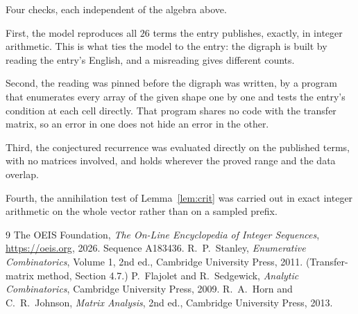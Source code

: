 \documentclass[11pt,a4paper]{article}
\theoremstyle{plain}
\theoremstyle{definition}
\begin{document}
Four checks, each independent of the algebra above.

First, the model reproduces all $26$ terms the entry publishes, exactly, in integer
arithmetic. This is what ties the model to the entry: the digraph is built by reading the
entry's English, and a misreading gives different counts.

Second, the reading was pinned before the digraph was written, by a program that enumerates
every array of the given shape one by one and tests the entry's condition at each cell
directly. That program shares no code with the transfer matrix, so an error in one does not
hide an error in the other.

Third, the conjectured recurrence was evaluated directly on the published terms, with no
matrices involved, and holds wherever the proved range and the data overlap.

Fourth, the annihilation test of Lemma~\ref{lem:crit} was carried out in exact integer
arithmetic on the whole vector rather than on a sampled prefix.

\begin{thebibliography}{9}
 The OEIS Foundation, \emph{The On-Line Encyclopedia of Integer
Sequences}, \url{https://oeis.org}, 2026. Sequence A183436.
 R.~P.~Stanley, \emph{Enumerative Combinatorics}, Volume 1, 2nd ed.,
Cambridge University Press, 2011. (Transfer-matrix method, Section 4.7.)
 P.~Flajolet and R.~Sedgewick, \emph{Analytic Combinatorics}, Cambridge
University Press, 2009.
 R.~A.~Horn and C.~R.~Johnson, \emph{Matrix Analysis}, 2nd ed., Cambridge
University Press, 2013.
\end{thebibliography}
\end{document}
